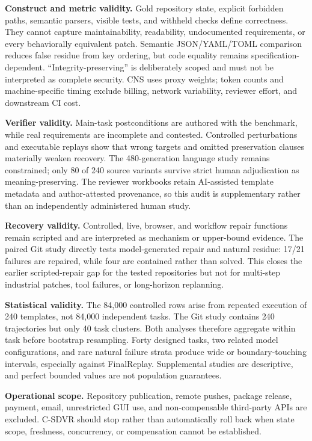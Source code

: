\documentclass[pdflatex,sn-apa]{sn-jnl}
\begin{document}
\textbf{Construct and metric validity.} Gold repository state, explicit forbidden paths, semantic parsers, visible tests, and withheld checks define correctness. They cannot capture maintainability, readability, undocumented requirements, or every behaviorally equivalent patch. Semantic JSON/YAML/TOML comparison reduces false residue from key ordering, but code equality remains specification-dependent. ``Integrity-preserving'' is deliberately scoped and must not be interpreted as complete security. CNS uses proxy weights; token counts and machine-specific timing exclude billing, network variability, reviewer effort, and downstream CI cost.

\textbf{Verifier validity.} Main-task postconditions are authored with the benchmark, while real requirements are incomplete and contested. Controlled perturbations and executable replays show that wrong targets and omitted preservation clauses materially weaken recovery. The 480-generation language study remains constrained; only 80 of 240 source variants survive strict human adjudication as meaning-preserving. The reviewer workbooks retain AI-assisted template metadata and author-attested provenance, so this audit is supplementary rather than an independently administered human study.

\textbf{Recovery validity.} Controlled, live, browser, and workflow repair functions remain scripted and are interpreted as mechanism or upper-bound evidence. The paired Git study directly tests model-generated repair and natural residue: 17/21 failures are repaired, while four are contained rather than solved. This closes the earlier scripted-repair gap for the tested repositories but not for multi-step industrial patches, tool failures, or long-horizon replanning.

\textbf{Statistical validity.} The 84,000 controlled rows arise from repeated execution of 240 templates, not 84,000 independent tasks. The Git study contains 240 trajectories but only 40 task clusters. Both analyses therefore aggregate within task before bootstrap resampling. Forty designed tasks, two related model configurations, and rare natural failure strata produce wide or boundary-touching intervals, especially against FinalReplay. Supplemental studies are descriptive, and perfect bounded values are not population guarantees.

\textbf{Operational scope.} Repository publication, remote pushes, package release, payment, email, unrestricted GUI use, and non-compensable third-party APIs are excluded. C-SDVR should stop rather than automatically roll back when state scope, freshness, concurrency, or compensation cannot be established.
\end{document}

